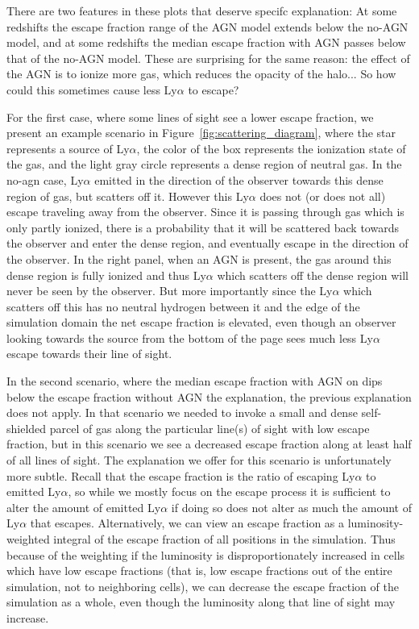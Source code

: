 There are two features in these plots that deserve specifc explanation: At some redshifts the escape fraction range of the AGN model extends below the no-AGN model, and at some redshifts the median escape fraction with AGN passes below that of the no-AGN model.
These are surprising for the same reason: the effect of the AGN is to ionize more gas, which reduces the opacity of the halo... So how could this sometimes cause less Ly$\alpha$ to escape?

For the first case, where some lines of sight see a lower escape fraction, we present an example scenario in Figure~\ref{fig:scattering_diagram}, where the star represents a source of Ly$\alpha$, the color of the box represents the ionization state of the gas, and the light gray circle represents a dense region of neutral gas.
In the no-agn case, Ly$\alpha$ emitted in the direction of the observer towards this dense region of gas, but scatters off it.
However this Ly$\alpha$ does not (or does not all) escape traveling away from the observer.
Since it is passing through gas which is only partly ionized, there is a probability that it will be scattered back towards the observer and enter the dense region, and eventually escape in the direction of the observer.
In the right panel, when an AGN is present, the gas around this dense region is fully ionized and thus Ly$\alpha$ which scatters off the dense region will never be seen by the observer.
But more importantly since the Ly$\alpha$ which scatters off this has no neutral hydrogen between it and the edge of the simulation domain the net escape fraction is elevated, even though an observer looking towards the source from the bottom of the page sees much less Ly$\alpha$ escape towards their line of sight.

In the second scenario, where the median escape fraction with AGN on dips below the escape fraction without AGN the explanation, the previous explanation does not apply.
In that scenario we needed to invoke a small and dense self-shielded parcel of gas along the particular line(s) of sight with low escape fraction, but in this scenario we see a decreased escape fraction along at least half of all lines of sight.
The explanation we offer for this scenario is unfortunately more subtle.
Recall that the escape fraction is the ratio of escaping Ly$\alpha$ to emitted Ly$\alpha$, so while we mostly focus on the escape process it is sufficient to alter the amount of emitted Ly$\alpha$ if doing so does not alter as much the amount of Ly$\alpha$ that escapes.
Alternatively, we can view an escape fraction as a luminosity-weighted integral of the escape fraction of all positions in the simulation.
Thus because of the weighting if the luminosity is disproportionately increased in cells which have low escape fractions (that is, low escape fractions out of the entire simulation, not to neighboring cells), we can decrease the escape fraction of the simulation as a whole, even though the luminosity along that line of sight may increase.


